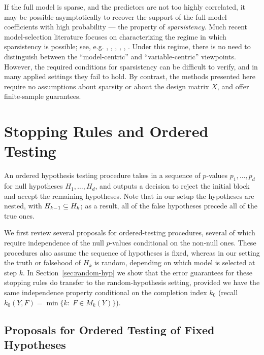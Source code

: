 \documentclass{article}
\begin{document}
If the full model is sparse, and the predictors are not too highly correlated, it may be possible asymptotically to recover the support of the full-model coefficients with high probability --- the property of {\em sparsistency}. Much recent model-selection literature focuses on characterizing the regime in which sparsistency is possible; see, e.g. \citet{bickel2009simultaneous}, \citet{meinshausen2006high}, \citet{negahban2009unified}, \citet{van2009conditions}, \citet{wainwright2009sharp}, \citet{zhao2006model}. Under this regime, there is no need to distinguish between the ``model-centric'' and ``variable-centric'' viewpoints. However, the required conditions for sparsistency can be difficult to verify, and in many applied settings they fail to hold. By contrast, the methods presented here require no assumptions about sparsity or about the design matrix $X$, and offer finite-sample guarantees.

\section{Stopping Rules and Ordered Testing}\label{sec:ordered}

An ordered hypothesis testing procedure takes in a sequence of $p$-values $p_1, \ldots, p_d$ for null hypotheses $H_{1}, \ldots, H_{d}$, and outputs a decision \smash{$\hk$} to reject the initial block  and accept the remaining hypotheses. Note that in our setup the hypotheses are nested, with $H_{k-1} \subseteq H_k$; as a result, all of the false hypotheses precede all of the true ones.

We first review several proposals for ordered-testing procedures, several of which require independence of the null $p$-values conditional on the non-null ones. These procedures also assume the sequence of hypotheses is fixed, whereas in our setting the truth or falsehood of $H_k$ is random, depending on which model is selected at step $k$. In Section~\ref{sec:random-hyp} we show that the error guarantees for these stopping rules do transfer to the random-hypothesis setting, provided we have the same independence property conditional on the completion index $k_0$ (recall 
$k_0(Y, F) = \min\{k:\; F \in M_k(Y)\}$).

\subsection{Proposals for Ordered Testing of Fixed Hypotheses}
\label{sec:orderedProposals}
\end{document}
